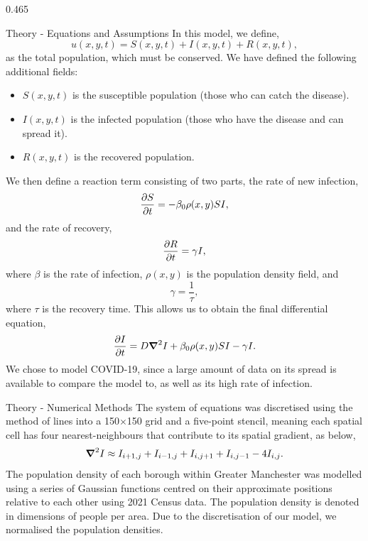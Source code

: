 \documentclass{beamer} %
\begin{document}
\begin{frame}[t]
\begin{columns}[t]
\begin{column}{0.465\textwidth}
\begin{block}{Theory - Equations and Assumptions}
	In this model, we define,
	\begin{equation}
		u(x,y,t) = S(x,y,t) + I(x,y,t) + R(x,y,t),
	\end{equation}
	as the total population, which must be conserved. We have defined the following additional fields:
	\begin{itemize}
		\item $S(x,y,t)$ is the susceptible population (those who can catch the disease).
		\item $I(x,y,t)$ is the infected population (those who have the disease and can spread it).
		\item $R(x,y,t)$ is the recovered population.
	\end{itemize}
	We then define a reaction term consisting of two parts, the rate of new infection,
	\begin{equation}
		\pdv{S}{t} = -\beta_0\rho(x,y)SI,
	\end{equation}
	and the rate of recovery,
	\begin{equation}
		\pdv{R}{t}= \gamma I,
	\end{equation}
	where $\beta$ is the rate of infection, $\rho(x,y)$ is the population density field, and
	\begin{equation}
			\gamma = \frac{1}{\tau},
	\end{equation}
	where $\tau$ is the recovery time. This allows us to obtain the final differential equation,
	\begin{equation}
		\pdv{I}{t} = D\grad^2 I + \beta_0\rho(x,y)SI - \gamma I. \label{eq:6}
	\end{equation}
	We chose to model COVID-19, since a large amount of data on its spread is available to compare the model to, as well as its high rate of infection.
\end{block}
\begin{block}{Theory - Numerical Methods}
	The system of equations was discretised using the method of lines into a 150$\times$150 grid and a five-point stencil, meaning each spatial cell has four nearest-neighbours that contribute to its spatial gradient, as below,
	\begin{equation}
		\grad^2I \approx I_{i+1,j} + I_{i-1,j} + I_{i,j+1} + I_{i,j-1} - 4I_{i,j}.
	\end{equation}
	The population density of each borough within Greater Manchester was modelled using a series of Gaussian functions centred on their approximate positions relative to each other using 2021 Census data. The population density is denoted in dimensions of people per area. Due to the discretisation of our model, we normalised the population densities.
	

\end{block}
\end{column}
\end{columns}
\end{frame}
\end{document}
